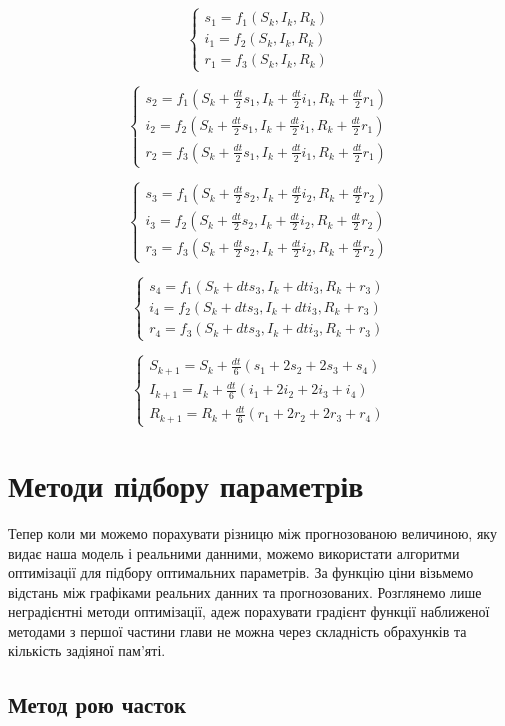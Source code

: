 $$
\begin{cases}
    s_1 = f_1(S_k, I_k, R_k) \\
    i_1 = f_2(S_k, I_k, R_k) \\
    r_1 = f_3(S_k, I_k, R_k)
\end{cases}
$$


$$
\begin{cases}
    s_2 = f_1(S_k + \frac{dt}{2} s_1, I_k + \frac{dt}{2} i_1, R_k + 
    \frac{dt}{2} r_1) \\
    i_2 = f_2(S_k + \frac{dt}{2} s_1, I_k + \frac{dt}{2} i_1, R_k + 
    \frac{dt}{2} r_1) \\
    r_2 = f_3(S_k + \frac{dt}{2} s_1, I_k + \frac{dt}{2} i_1, R_k + 
    \frac{dt}{2} r_1) 
\end{cases}
$$


$$
\begin{cases}
    s_3 = f_1(S_k + \frac{dt}{2} s_2, I_k + \frac{dt}{2} i_2, R_k + 
    \frac{dt}{2} r_2) \\
    i_3 = f_2(S_k + \frac{dt}{2} s_2, I_k + \frac{dt}{2} i_2, R_k + 
    \frac{dt}{2} r_2) \\
    r_3 = f_3(S_k + \frac{dt}{2} s_2, I_k + \frac{dt}{2} i_2, R_k + 
    \frac{dt}{2} r_2) 
\end{cases}
$$


$$
\begin{cases}
    s_4 = f_1(S_k + dt s_3, I_k + dt i_3, R_k + r_3) \\
    i_4 = f_2(S_k + dt s_3, I_k + dt i_3, R_k + r_3) \\
    r_4 = f_3(S_k + dt s_3, I_k + dt i_3, R_k + r_3) 
\end{cases}
$$


$$
\begin{cases}
    S_{k + 1} = S_k + \frac{dt}{6} (s_1 + 2s_2 + 2s_3 + s_4)\\
    I_{k + 1} = I_k + \frac{dt}{6} (i_1 + 2i_2 + 2i_3 + i_4)\\
    R_{k + 1} = R_k + \frac{dt}{6} (r_1 + 2r_2 + 2r_3 + r_4)
\end{cases}
$$ 


\section{Методи підбору параметрів}


Тепер коли ми можемо порахувати різницю між прогнозованою величиною, 
яку видає наша модель і реальними данними, можемо використати алгоритми 
оптимізації для підбору оптимальних параметрів. За функцію ціни візьмемо 
відстань між графіками реальних данних та прогнозованих. 
Розглянемо лише неградієнтні методи оптимізації, адеж порахувати градієнт 
функції наближеної методами з першої частини глави не можна через 
складність обрахунків та кількість задіяної пам'яті.


\subsection{Метод рою часток}

